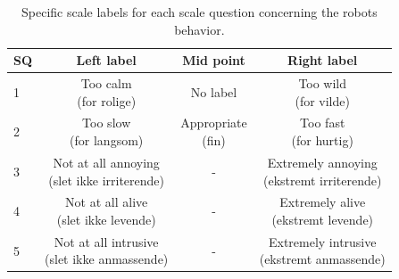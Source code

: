 \noindent
%
%
\begin{table}[H]
	\centering
\caption{Specific scale labels for each scale question concerning the robots behavior.}
	\label{tab:BehaviorScale} 
	\begin{tabular}{l|c|c|c}
		SQ     & Left label & Mid point & Right label \\\hline
		1   & \makecell{Too calm \\(for rolige)} & No label & \makecell{Too wild \\(for vilde)}           \\\hline
		2   & \makecell{Too slow \\(for langsom)} & \makecell{Appropriate \\(fin)} & \makecell{Too fast \\(for hurtig)}   \\\hline
		3   & \makecell{Not at all annoying \\(slet ikke irriterende)} & - & \makecell{Extremely annoying \\(ekstremt irriterende)}          \\\hline
	 	4   & \makecell{Not at all alive \\(slet ikke levende)} & - & \makecell{Extremely alive \\(ekstremt levende)}         \\\hline
		5   & \makecell{Not at all intrusive \\(slet ikke anmassende)} & - & \makecell{Extremely intrusive \\(ekstremt anmassende)}             
	\end{tabular}
\end{table}
\noindent
%
%
